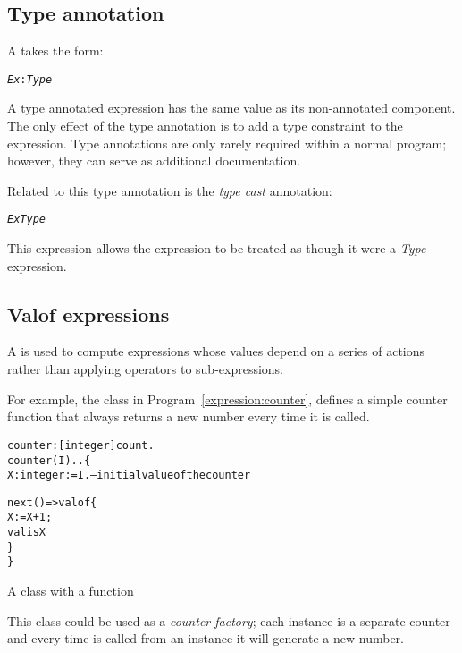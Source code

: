 \subsection{Type annotation}
\label{expression:typeannotation}
A   takes the form:
\begin{alltt}
\emph{Ex}:\emph{Type}
\end{alltt}
A type annotated expression has the same value as its non-annotated component. The only effect of the type annotation is to add a type constraint to the expression. Type annotations are only rarely required within a normal \go program; however, they can serve as additional documentation.

Related to this type annotation is the \emph{type cast} annotation:
\begin{alltt}
\emph{Ex}\tcast\emph{Type}
\end{alltt}
This expression allows the  expression to be treated as though it were a \emph{Type} expression.

\subsection{Valof expressions}
\label{expression:valof}

A  is used to compute expressions whose values depend on a series of actions rather than applying operators to sub-expressions. 

For example, the  class in Program~\vref{expression:counter}, defines a simple counter function that always returns a new number every time it is called.
\begin{program}
\vspace{0.5ex}
\begin{alltt}
counter:[integer]\sconarrow{}count.
counter(I)..\{
  X:integer := I.           -- initial value of the counter
  
  next() => valof\{
    X := X+1;
    valis X
  \}
\}
\end{alltt}
\vspace{-2ex}
\caption{A  class with a  function}
\label{expression:counter}
\end{program}
This class could be used as a \emph{counter factory}; each instance is a separate counter and every time  is called from an instance it will generate a new number.

